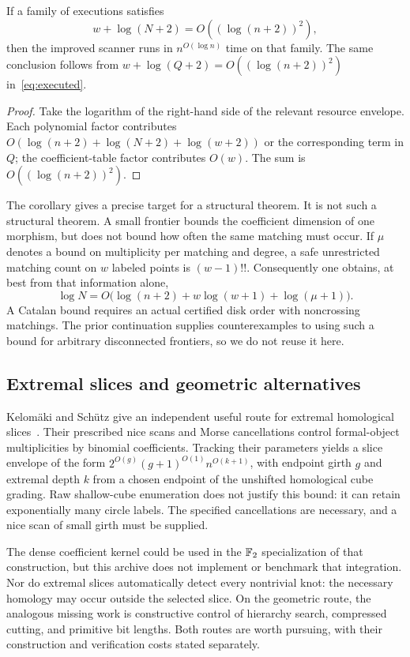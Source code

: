 \begin{samepage}
\begin{corollary}
\label{cor:qp}
If a family of executions satisfies
\[
 w+\log(N+2)=O((\log(n+2))^2),
\]
then the improved scanner runs in $n^{O(\log n)}$ time on that family.
The same conclusion follows from
$w+\log(Q+2)=O((\log(n+2))^2)$ in~\eqref{eq:executed}.
\end{corollary}
\end{samepage}
\begin{proof}
Take the logarithm of the right-hand side of the relevant resource
envelope. Each polynomial factor contributes
$O(\log(n+2)+\log(N+2)+\log(w+2))$ or the corresponding term in $Q$;
the coefficient-table factor contributes $O(w)$. The sum is
$O((\log(n+2))^2)$.
\end{proof}

The corollary gives a precise target for a structural theorem. It is not
such a structural theorem. A small frontier bounds the coefficient
dimension of one morphism, but does not bound how often the same matching
must occur. If $\mu$ denotes a bound on multiplicity per matching and
degree, a safe unrestricted matching count on $w$ labeled points is
$(w-1)!!$. Consequently one obtains, at best from that information alone,
\[
 \log N=O\bigl(\log(n+2)+w\log(w+1)+\log(\mu+1)\bigr).
\]
A Catalan bound requires an actual certified disk order with noncrossing
matchings. The prior continuation supplies counterexamples to using such
a bound for arbitrary disconnected frontiers, so we do not reuse it here.



\subsection{Extremal slices and geometric alternatives}

Kelom\"aki and Sch\"utz give an independent useful route for extremal
homological slices~\cite{kelomaki}. Their prescribed nice scans and Morse
cancellations control formal-object multiplicities by binomial coefficients.
Tracking their parameters yields a slice envelope of the form
$2^{O(g)}(g+1)^{O(1)}n^{O(k+1)}$, with endpoint girth $g$ and extremal
depth $k$ from a chosen endpoint of the unshifted homological cube
grading. Raw shallow-cube enumeration does not justify this bound: it
can retain exponentially many circle labels. The specified cancellations
are necessary, and a nice scan of small girth must be supplied.

The dense coefficient kernel could be used in the $\mathbb F_2$ specialization of
that construction, but
this archive does not implement or benchmark that integration. Nor do
extremal slices automatically detect every nontrivial knot: the necessary
homology may occur outside the selected slice. On the geometric route,
the analogous missing work is constructive control of hierarchy search,
compressed cutting, and primitive bit lengths. Both routes are worth
pursuing, with their construction and verification costs stated separately.
